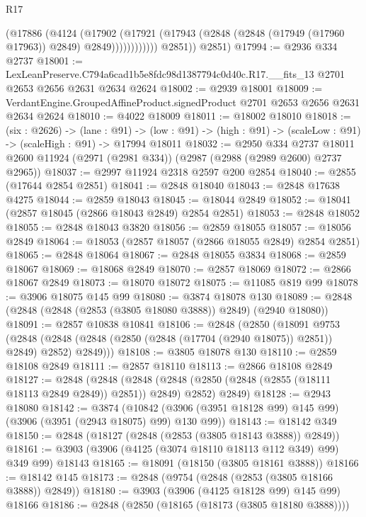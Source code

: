 \begin{lexlean}{R17}
\begin{coremodule}
                      (@17886
                        (@4124
                          (@17902
                            (@17921
                              (@17943
                                (@2848 (@2848 (@17949 (@17960 @17963)) @2849) @2849))))))))))))
          @2851))
      @2851)
@17994 := @2936 @334 @2737
@18001 := LexLeanPreserve.C794a6cad1b5e8fdc98d1387794c0d40c.R17.__fits_13
    @2701
    @2653
    @2656
    @2631
    @2634
    @2624
@18002 := @2939 @18001
@18009 := VerdantEngine.GroupedAffineProduct.signedProduct @2701 @2653 @2656 @2631 @2634 @2624
@18010 := @4022 @18009
@18011 := @18002 @18010
@18018 := (six : @2626) ->
  (lane : @91) ->
  (low : @91) -> (high : @91) -> (scaleLow : @91) -> (scaleHigh : @91) -> @17994 @18011
@18032 := @2950
    @334
    @2737
    @18011
    @2600
    @11924
    (@2971 (@2981 @334))
    (@2987 (@2988 (@2989 @2600) @2737 @2965))
@18037 := @2997 @11924 @2318 @2597 @200 @2854
@18040 := @2855 (@17644 @2854 @2851)
@18041 := @2848 @18040
@18043 := @2848 @17638 @4275
@18044 := @2859 @18043
@18045 := @18044 @2849
@18052 := @18041 (@2857 @18045 (@2866 @18043 @2849) @2854 @2851)
@18053 := @2848 @18052
@18055 := @2848 @18043 @3820
@18056 := @2859 @18055
@18057 := @18056 @2849
@18064 := @18053 (@2857 @18057 (@2866 @18055 @2849) @2854 @2851)
@18065 := @2848 @18064
@18067 := @2848 @18055 @3834
@18068 := @2859 @18067
@18069 := @18068 @2849
@18070 := @2857 @18069
@18072 := @2866 @18067 @2849
@18073 := @18070 @18072
@18075 := @11085 @819 @99
@18078 := @3906 @18075 @145 @99
@18080 := @3874 @18078 @130
@18089 := @2848 (@2848 (@2848 (@2853 (@3805 @18080 @3888)) @2849) (@2940 @18080))
@18091 := @2857 @10838 @10841
@18106 := @2848
    (@2850
      (@18091
        @9753
        (@2848 (@2848 (@2848 (@2850 (@2848 (@17704 (@2940 @18075)) @2851)) @2849) @2852) @2849)))
@18108 := @3805 @18078 @130
@18110 := @2859 @18108 @2849
@18111 := @2857 @18110
@18113 := @2866 @18108 @2849
@18127 := @2848
    (@2848
      (@2848 (@2848 (@2850 (@2848 (@2855 (@18111 @18113 @2849 @2849)) @2851)) @2849) @2852)
      @2849)
@18128 := @2943 @18080
@18142 := @3874
    (@10842 (@3906 (@3951 @18128 @99) @145 @99) (@3906 (@3951 (@2943 @18075) @99) @130 @99))
@18143 := @18142 @349
@18150 := @2848 (@18127 (@2848 (@2853 (@3805 @18143 @3888)) @2849))
@18161 := @3903 (@3906 (@4125 (@3074 @18110 @18113 @112 @349) @99) @349 @99) @18143
@18165 := @18091 (@18150 (@3805 @18161 @3888))
@18166 := @18142 @145
@18173 := @2848 (@9754 (@2848 (@2853 (@3805 @18166 @3888)) @2849))
@18180 := @3903 (@3906 (@4125 @18128 @99) @145 @99) @18166
@18186 := @2848 (@2850 (@18165 (@18173 (@3805 @18180 @3888))))

\end{coremodule}
\end{lexlean}
